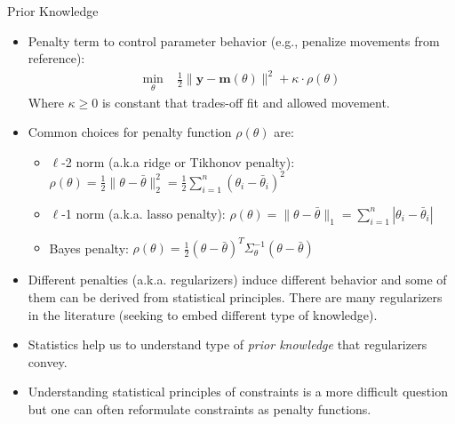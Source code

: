 \documentclass[9pt]{beamer}
\begin{document}
%
\begin{frame}{Prior Knowledge}

\begin{itemize}
\setlength{\itemsep}{5pt}
\item Penalty term to control parameter behavior (e.g., penalize movements from reference):
\begin{align*}
\min_{\theta}& \; \frac{1}{2}\|\mathbf{y}- \mathbf{m}(\theta)\|^2+\kappa\cdot  \rho(\theta)
\end{align*}
Where $\kappa\geq 0$ is constant that trades-off fit and allowed movement. 
\item Common choices for penalty function $\rho(\theta)$ are:
\begin{itemize}
\setlength{\itemsep}{5pt}
\item  $\ell$-2 norm (a.k.a ridge or Tikhonov penalty): $\rho(\theta)=\frac{1}{2}\|\theta-\bar{\theta}\|_2^2=\frac{1}{2}\sum_{i=1}^n(\theta_i-\bar{\theta}_i)^2$
\item $\ell$-1 norm (a.k.a. lasso penalty): $\rho(\theta)=\|\theta-\bar{\theta}\|_1=\sum_{i=1}^n
|\theta_i-\bar{\theta}_i|$
\item Bayes penalty: $\rho(\theta)=\frac{1}{2}(\theta-\bar{\theta})^T\Sigma_\theta^{-1} (\theta -\bar{\theta})$
\end{itemize}
\item Different penalties  (a.k.a. regularizers) induce different behavior and some of them can be derived from statistical principles. There are many regularizers in the literature (seeking to embed different type of knowledge).
\item Statistics help us to understand type of {\em prior knowledge} that regularizers convey. 
\item Understanding statistical principles of constraints is a more difficult question but one can often reformulate constraints as penalty functions. 
\end{itemize}

\end{frame}
\end{document}

